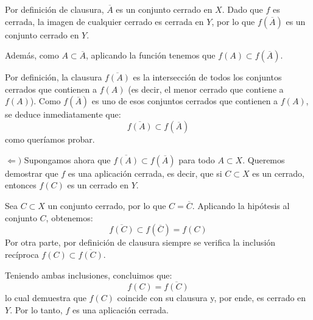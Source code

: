 \begin{ejer}
\begin{itemize}
\begin{sol}
    Por definición de clausura, $\overline{A}$ es un conjunto cerrado en $X$. Dado que $f$ es cerrada, la imagen de cualquier cerrado es cerrada en $Y$, por lo que $f(\overline{A})$ es un conjunto cerrado en $Y$.
    
    Además, como $A \subset \overline{A}$, aplicando la función tenemos que $f(A) \subset f(\overline{A})$.
    
    Por definición, la clausura $\overline{f(A)}$ es la intersección de todos los conjuntos cerrados que contienen a $f(A)$ (es decir, el menor cerrado que contiene a $f(A)$). Como $f(\overline{A})$ es uno de esos conjuntos cerrados que contienen a $f(A)$, se deduce inmediatamente que:
    \[
        \overline{f(A)} \subset f(\overline{A})
    \]
    como queríamos probar.

    \medskip

    $\Leftarrow)$ Supongamos ahora que $\overline{f(A)} \subset f(\overline{A})$ para todo $A \subset X$. Queremos demostrar que $f$ es una aplicación cerrada, es decir, que si $C \subset X$ es un cerrado, entonces $f(C)$ es un cerrado en $Y$.
    
    Sea $C \subset X$ un conjunto cerrado, por lo que $C = \overline{C}$. Aplicando la hipótesis al conjunto $C$, obtenemos:
    \[
        \overline{f(C)} \subset f(\overline{C}) = f(C)
    \]
    Por otra parte, por definición de clausura siempre se verifica la inclusión recíproca $f(C) \subset \overline{f(C)}$.
    
    Teniendo ambas inclusiones, concluimos que:
    \[
        f(C) = \overline{f(C)}
    \]
    lo cual demuestra que $f(C)$ coincide con su clausura y, por ende, es cerrado en $Y$. Por lo tanto, $f$ es una aplicación cerrada.
\end{sol}
    \end{itemize}
\end{ejer}
